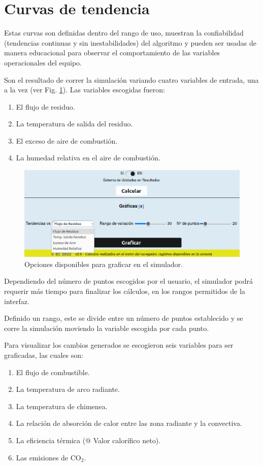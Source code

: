 \section{Curvas de tendencia}
\par Estas curvas son definidas dentro del rango de uso, muestran la confiabilidad (tendencias continuas y sin inestabilidades) del algoritmo y pueden ser usadas de manera educacional para observar el comportamiento de las variables operacionales del equipo.
\par Son el resultado de correr la simulación variando cuatro variables de entrada, una a la vez (ver Fig. \ref{fig:curvas}). Las variables escogidas fueron:
\begin{enumerate}
    \item El flujo de residuo.
    \item La temperatura de salida del residuo.
    \item El exceso de aire de combustión.
    \item La humedad relativa en el aire de combustión.
\end{enumerate}
\begin{figure}[H]\begin{center}
\includegraphics[scale=0.48]{images/curvas}
\caption[Opciones disponibles para graficar en el simulador]{Opciones disponibles para graficar en el simulador.}
\label{fig:curvas}\end{center}\end{figure}
\par Dependiendo del número de puntos escogidos por el usuario, el simulador podrá requerir más tiempo para finalizar los cálculos, en los rangos permitidos de la interfaz.
\par Definido un rango, este se divide entre un número de puntos establecido y se corre la simulación moviendo la variable escogida por cada punto.
\par Para visualizar los cambios generados se escogieron seis variables para ser graficadas, las cuales son:
\begin{enumerate}
    \item El flujo de combustible.
    \item La temperatura de arco radiante.
    \item La temperatura de chimenea.
    \item La relación de absorción de calor entre las zona radiante y la convectiva.
    \item La eficiencia térmica (@ Valor calorífico neto).
    \item Las emisiones de CO$_2$.
\end{enumerate}

